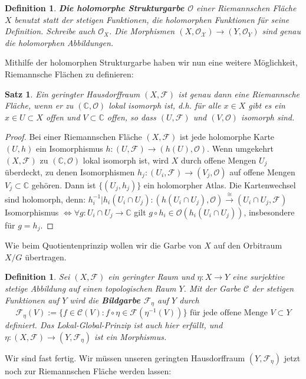 \documentclass[12pt,a4paper]{article}
\theoremstyle{plain}
\newtheorem{Satz}[Theorem]{Satz}
\newtheorem{Definition}[Theorem]{Definition}
\newcommand{\herv}[1]{{\emph{\textbf{#1}}}}
\newcommand{\C}{\mathbb{C}}
\numberwithin{equation}{section}
\begin{document}
\begin{Definition}\herv{Die holomorphe Strukturgarbe $\mathcal{O}$} einer Riemannschen Fläche $X$ benutzt statt der stetigen Funktionen, die holomorphen Funktionen für seine Definition. Schreibe auch $\mathcal{O}_X$. Die Morphismen $(X,\mathcal{O_X})\rightarrow (Y,\mathcal{O}_Y)$ sind genau die holomorphen Abbildungen.
\end{Definition}
Mithilfe der holomorphen Strukturgarbe haben wir nun eine weitere Möglichkeit, Riemannsche Flächen zu definieren:
\begin{Satz} Ein geringter Hausdorffraum $(X,\mathcal{F})$ ist genau dann eine Riemannsche Fläche, wenn er zu $(\C,\mathcal{O})$ lokal isomorph ist, d.h. für alle $x\in X$ gibt es ein $x\in U\subset X$ offen und $V\subset \C$ offen, so dass $(U,\mathcal{F})$ und $(V,\mathcal{O})$ isomorph sind.
\end{Satz}
\begin{proof}
Bei einer Riemannschen Fläche $(X,\mathcal{F})$ ist jede holomorphe Karte $(U,h)$ ein Isomorphismus $h:(U,\mathcal{F})\rightarrow (h(U),\mathcal{O})$. Wenn umgekehrt $(X,\mathcal{F})$ zu $(\C,\mathcal{O})$ lokal isomorph ist, wird $X$ durch offene Mengen $U_j$ überdeckt, zu denen Isomorphismen $h_j:(U_i,\mathcal{F})\rightarrow (V_j,\mathcal{O})$ auf offene Mengen $V_j\subset\C$ gehören. Dann ist $\{(U_j,h_j)\}$ ein holomorpher Atlas. Die Kartenwechsel sind holomorph, denn: $h_i^{-1}|h_i(U_i\cap U_j) : (h(U_i\cap U_j),\mathcal{O}) \xrightarrow{\cong} (U_i\cap U_j,\mathcal{F})$ Isomorphismus $\Leftrightarrow \forall g: U_i \cap U_j \rightarrow \C$ gilt $g\circ h_i \in \mathcal{O}(h_i(U_i\cap U_j))$, insbesondere für $g=h_j$.
\end{proof}
Wie beim Quotientenprinzip wollen wir die Garbe von $X$ auf den Orbitraum $X/G$ \glqq übertragen\grqq.
\begin{Definition} Sei $(X,\mathcal{F})$ ein geringter Raum und $\eta: X\rightarrow Y$ eine surjektive stetige Abbildung auf einen topologischen Raum $Y$. Mit der Garbe $\mathcal{C}$ der stetigen Funktionen auf $Y$ wird die \herv{Bildgarbe $\mathcal{F}_\eta$} auf $Y$ durch \[\mathcal{F}_\eta(V):=\{f\in\mathcal{C}(V):f\circ\eta\in\mathcal{F}(\eta^{-1}(V))\} \text{ für jede offene Menge }V\subset Y \]
definiert. Das Lokal-Global-Prinzip ist auch hier erfüllt, und $\eta:(X,\mathcal{F})\rightarrow (Y,\mathcal{F}_\eta)$ ist ein Morphismus.
\end{Definition}
Wir sind fast fertig. Wir müssen unseren geringten Hausdorffraum $(Y,\mathcal{F}_\eta)$ jetzt noch zur Riemannschen Fläche werden lassen:
\end{document}
